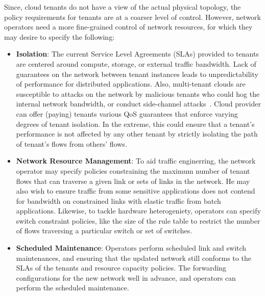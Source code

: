 Since, cloud tenants do not have a view of the actual physical
topology, the policy requirements for tenants are at a coarser level
of control. However, network operators need a more fine-grained
control of network resources, for which they may desire to specify the
following:

\begin{itemize}
\item \textbf{Isolation}: The current Service Level Agreements (SLAs)
  provided to tenants are centered around compute, storage, or
  external traffic bandwidth. Lack of guarantees on the network
  between tenant instances leads to unpredictability of performance
  for distributed applications. Also, multi-tenant clouds are
  susceptible to attacks on the network by malicious tenants who could
  hog the internal network bandwidth, or conduct side-channel
  attacks~\cite{heyyou-ccs}. %
  Cloud provider can offer (paying) tenants various QoS guarantees
  that enforce varying degrees of tenant isolation. In the extreme,
  this could ensure that a tenant's performance is not affected by
  any other tenant by strictly isolating the path of tenant's flows
  from others' flows. 
\item \textbf{Network Resource Management}: To aid traffic
  enginerring, the network operator may specify policies constraining
  the maximum number of tenant flows that can traverse a given link or
  sets of links in the network. He may also wish to ensure traffic
  from some sensitive applications does not contend for bandwidth on
  constrained links with elastic traffic from batch applications.
  Likewise, to tackle hardware heterogeniety, operators can specify
  switch constraint policies, like the size of the rule table to
  restrict the number of flows traversing a particular switch or set
  of switches.
\item \textbf{Scheduled Maintenance}:  Operators perform scheduled link and
  switch maintenances, and ensuring that the updated network still
  conforms to the SLAs of the tenants and resource capacity
  policies.  The
  forwarding configurations for the new network well in advance, and
  operators can perform the scheduled maintenance.
\end{itemize}

